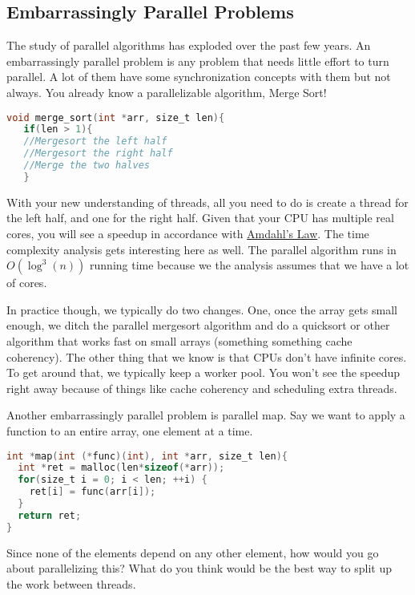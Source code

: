 \subsection{Embarrassingly Parallel Problems}

The study of parallel algorithms has exploded over the past few years.
An embarrassingly parallel problem is any problem that needs little effort to turn parallel.
A lot of them have some synchronization concepts with them but not always.
You already know a parallelizable algorithm, Merge Sort!

\begin{lstlisting}[language=C]
void merge_sort(int *arr, size_t len){
   if(len > 1){
   //Mergesort the left half
   //Mergesort the right half
   //Merge the two halves
   }
\end{lstlisting}

With your new understanding of threads, all you need to do is create a thread for the left half, and one for the right half.
Given that your CPU has multiple real cores, you will see a speedup in accordance with \href{https://en.wikipedia.org/wiki/Amdahl's_law}{Amdahl's Law}.
The time complexity analysis gets interesting here as well.
The parallel algorithm runs in $O(\log^3(n))$ running time because we the analysis assumes that we have a lot of cores.

In practice though, we typically do two changes.
One, once the array gets small enough, we ditch the parallel mergesort algorithm and do a quicksort or other algorithm that works fast on small arrays (something something cache coherency).
The other thing that we know is that CPUs don't have infinite cores.
To get around that, we typically keep a worker pool.
You won't see the speedup right away because of things like cache coherency and scheduling extra threads.

Another embarrassingly parallel problem is parallel map.
Say we want to apply a function to an entire array, one element at a time.

\begin{lstlisting}[language=C]
int *map(int (*func)(int), int *arr, size_t len){
  int *ret = malloc(len*sizeof(*arr));
  for(size_t i = 0; i < len; ++i) {
    ret[i] = func(arr[i]);
  }
  return ret;
}
\end{lstlisting}

Since none of the elements depend on any other element, how would you go about parallelizing this?
What do you think would be the best way to split up the work between threads.


